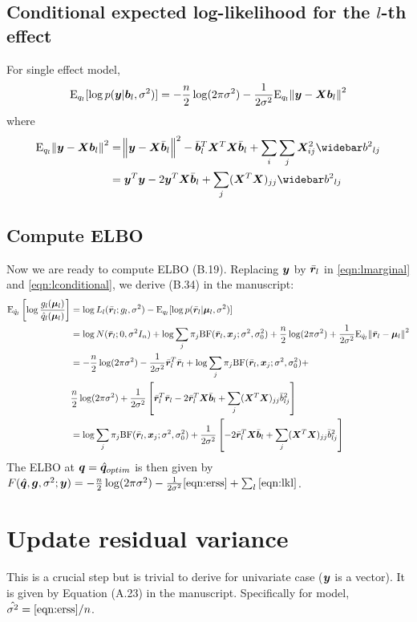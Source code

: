 \subsection{Conditional expected log-likelihood for the $l$-th effect}

For single effect model,
\begin{equation}
    \text{E}_{q_l}[\log p(\bm y|\bm b_l,\sigma^2)] = -\frac{n}{2}\log(2\pi\sigma^2) - \frac{1}{2\sigma^2}\text{E}_{q_l}\norm{\bm y - \bm X\bm b_l}^2  \label{eqn:lconditional}
\end{equation}
where
\begin{align}
    \E_{q_l}\norm{\vy - \mx\vb_l}^2 &= \norm{\vy - \mx \vbb_l}^2 - \vbb_l^T\mx^T\mx \vbb_l + \sum_i \sum_j \mx_{ij}^2 \bbb_{lj} \\
    &= \vy^T\vy -2 \vy^T \mx \vbb_l  + \sum_j (\mx^T \mx)_{jj} \bbb_{lj}
\end{align}

\subsection{Compute ELBO}
Now we are ready to compute ELBO (B.19).
Replacing $\bm y$ by $\bar{\bm r}_l$ in \eqref{eqn:lmarginal} and \eqref{eqn:lconditional}, we derive (B.34) in the manuscript:
\begin{align}
    \text{E}_{\hat{q}_l} \left[ \log \frac{g_l(\bm \mu_l)}{\hat{q}_l(\bm \mu_l)} \right] &= \log L_l(\bar{\bm r}_l; g_l,\sigma^2) - \text{E}_{q_l}[\log p(\bar{\bm r}_l|\bm \mu_l,\sigma^2)]  \\
    &= \log N(\bar{\bm r}_l; 0, \sigma^2 I_n) + \log \sum_j \pi_j \text{BF}(\bar{\bm r}_l, \bm x_j; \sigma^2, \sigma^2_0) + \frac{n}{2} \log(2\pi\sigma^2) +\frac{1}{2\sigma^2}\text{E}_{\hat{q}_l}\norm{\bar{\bm r}_l-\bm \mu_l}^2 \\
    &= -\frac{n}{2} \log(2\pi\sigma^2) -\frac{1}{2\sigma^2}\bar{\bm r}_l^T\bar{\bm r}_l + \log \sum_j \pi_j \text{BF}(\bar{\bm r}_l, \bm x_j; \sigma^2, \sigma^2_0) + \\
    & \frac{n}{2} \log(2\pi\sigma^2) +\frac{1}{2\sigma^2}\left[\bar{\bm r}_l^T\bar{\bm r}_l - 2\bar{\bm r}_l^T\bm X \bar{\bm b}_l + \sum_j (\bm X^T \bm X)_{jj} \bar{b}_{lj}^2 \right] \\
    &= \log \sum_j \pi_j \text{BF}(\bar{\bm r}_l, \bm x_j; \sigma^2, \sigma^2_0) + \frac{1}{2\sigma^2}\left[- 2\bar{\bm r}_l^T\bm X \bar{\bm b}_l + \sum_j (\bm X^T \bm X)_{jj} \bar{b}_{lj}^2\right] \label{eqn:lkl}
\end{align}
The ELBO at ${\bm q} = \hat{{\bm q}}_{optim}$ is then given by $F(\hat{{\bm q}},\bm g,\sigma^2; \bm y) = -\frac{n}{2} \log(2\pi\sigma^2) - \frac{1}{2\sigma^2} \eqref{eqn:erss} + \sum_l \eqref{eqn:lkl}$.

\section{Update residual variance}
This is a crucial step but is trivial to derive for univariate case ($\bm y$ is a vector). It is given by Equation (A.23) in the manuscript. Specifically for \susie model, $\hat{\sigma^2} = \eqref{eqn:erss}/n$.

